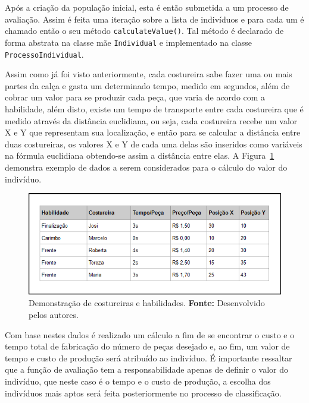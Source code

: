 \par Após a criação da população inicial, esta é então submetida a um processo
de avaliação. Assim é feita uma iteração sobre a lista de indivíduos e para cada um é chamado então o seu método 
\texttt{calculateValue()}. Tal método é declarado de forma abstrata na classe mãe
\texttt{Individual} e implementado na classe \texttt{ProcessoIndividual}.

\par Assim como já foi visto anteriormente, cada costureira sabe fazer uma ou
mais partes da calça e gasta um determinado tempo, medido em segundos, além de cobrar um valor 
para se produzir cada peça, que varia de  acordo com a habilidade, além disto, existe um 
tempo de transporte entre cada costureira que é medido através da distância euclidiana, 
ou seja, cada costureira recebe um valor X e Y que representam sua localização, e então 
para se calcular a distância entre duas costureiras, os valores X e Y de cada uma delas
são inseridos como variáveis na fórmula euclidiana obtendo-se assim
a distância entre elas. A Figura~\ref{fig:demonstracao_costureiras_habilidades} demonstra 
exemplo de dados a serem considerados para o cálculo do valor do indivíduo.


\begin{figure}[h!]
	\centerline{\includegraphics[scale=0.5]{./imagens/tempo_habilidade_3.PNG}}
	\caption[Demonstração de costureiras e habilidades.]
	{Demonstração de costureiras e habilidades. \textbf{Fonte:} Desenvolvido pelos
	autores.}
	\label{fig:demonstracao_costureiras_habilidades}
\end{figure}

\par Com base nestes dados é realizado um cálculo a fim de se encontrar o custo e o tempo total de fabricação do número de peças
desejado e, ao fim, um valor de tempo e custo de produção será atribuído ao indivíduo. É importante ressaltar que a função de avaliação tem a responsabilidade apenas de definir o valor do indivíduo, que neste caso é o tempo e o custo de produção, a escolha dos indivíduos mais aptos será feita posteriormente no processo de classificação.

